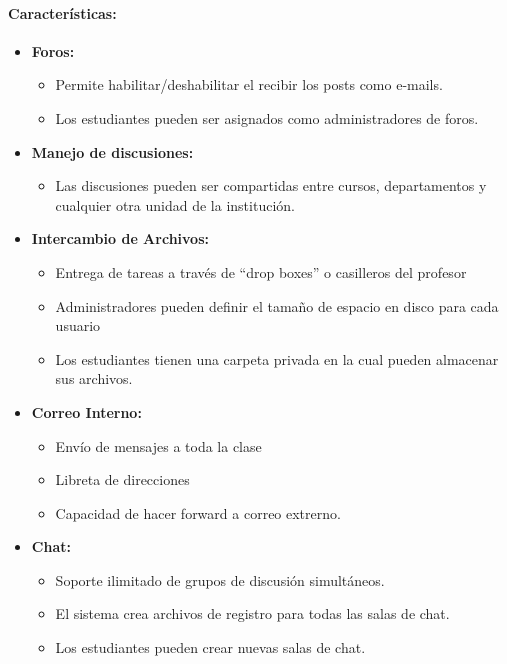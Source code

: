 	\paragraph{Características:}
	\begin{itemize}
		\item \textbf{Foros:}
		\begin{itemize}
			\item Permite habilitar/deshabilitar el recibir los posts como e-mails.
			\item Los estudiantes pueden ser asignados como administradores de foros.
		\end{itemize}
	\end{itemize}
	\begin{itemize}
		\item \textbf{Manejo de discusiones:}
		\begin{itemize}
			\item Las discusiones pueden ser compartidas entre cursos, departamentos y cualquier otra unidad de la institución.
		\end{itemize}
	\end{itemize}
	\begin{itemize}
		\item \textbf{Intercambio de Archivos:}
			\begin{itemize}
				\item Entrega de tareas a través de ``drop boxes'' o casilleros del profesor
				\item Administradores pueden definir el tamaño de espacio en disco para cada usuario
				\item Los estudiantes tienen una carpeta privada en la cual pueden almacenar sus archivos.
			\end{itemize}
	\end{itemize}
	\begin{itemize}
		\item \textbf{Correo Interno:}
			\begin{itemize}
				\item Envío de mensajes a toda la clase
				\item Libreta de direcciones
				\item Capacidad de hacer forward a correo extrerno.
			\end{itemize}
	\end{itemize}
	\begin{itemize}
		\item \textbf{Chat:}
			\begin{itemize}
				\item Soporte ilimitado de grupos de discusión simultáneos.
				\item El sistema crea archivos de registro para todas las salas de chat.
				\item Los estudiantes pueden crear nuevas salas de chat.
			\end{itemize}
	\end{itemize}
